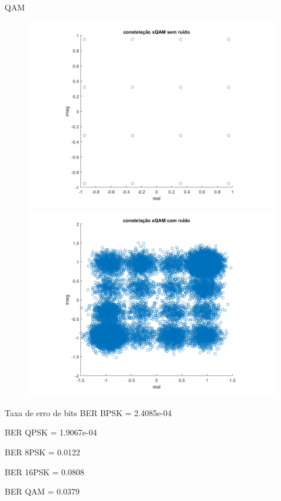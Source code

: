 ﻿\documentclass[mathserif]{beamer}
\begin{document}
	\begin{frame}{QAM}
		\begin{figure}
			\centering
			\includegraphics[scale=0.3]{../NossoCodigo2/figuras/modula6.png}
			\includegraphics[scale=0.3]{../NossoCodigo2/figuras/modula12.png}
		\end{figure}
	\end{frame}

	\begin{frame}{Taxa de erro de bits}
		BER BPSK = 2.4085e-04


		BER QPSK = 1.9067e-04


		BER 8PSK = 0.0122


		BER 16PSK = 0.0808


		BER QAM = 0.0379
	\end{frame}
\end{document}

